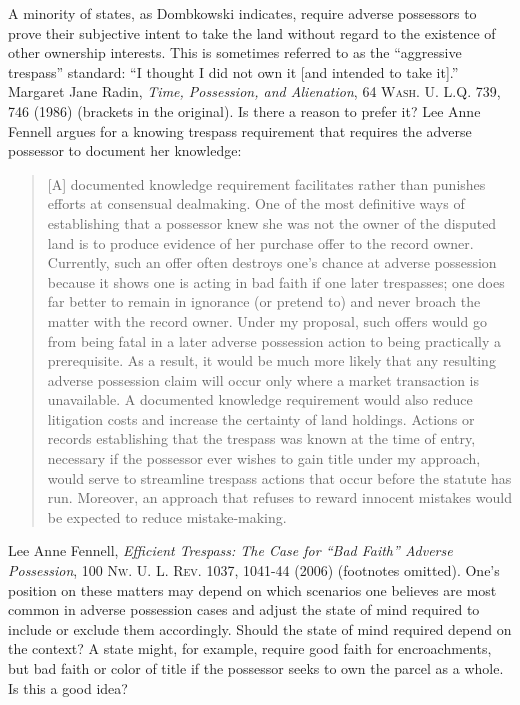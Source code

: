 
\item A minority of states, as Dombkowski indicates, require adverse possessors
to prove their subjective intent to take the land without regard to the
existence of other ownership interests. This is sometimes referred to as the
``aggressive trespass'' standard: ``I thought I did not own it [and intended to
take it].'' Margaret Jane Radin, \textit{Time, Possession, and Alienation}, 64
\textsc{Wash. U. L.Q.} 739, 746 (1986) (brackets in the original). Is there a
reason to prefer it? Lee Anne Fennell argues for a knowing trespass requirement
that requires the adverse possessor to document her knowledge:
\begin{quote}
[A] documented knowledge requirement facilitates rather than punishes efforts at
consensual dealmaking. One of the most definitive ways of establishing that a
possessor knew she was not the owner of the disputed land is to produce
evidence of her purchase offer to the record owner. Currently, such an offer
often destroys one's chance at adverse possession because it shows one is
acting in bad faith if one later trespasses; one does far better to remain in
ignorance (or pretend to) and never broach the matter with the record owner.
Under my proposal, such offers would go from being fatal in a later adverse
possession action to being practically a prerequisite. As a result, it would be
much more likely that any resulting adverse possession claim will occur only
where a market transaction is unavailable. A documented knowledge requirement
would also reduce litigation costs and increase the certainty of land holdings.
Actions or records establishing that the trespass was known at the time of
entry, necessary if the possessor ever wishes to gain title under my approach,
would serve to streamline trespass actions that occur before the statute has
run. Moreover, an approach that refuses to reward innocent mistakes would be
expected to reduce mistake-making.
\end{quote}
Lee Anne Fennell, \textit{Efficient Trespass: The Case for ``Bad Faith'' Adverse
Possession}, 100 \textsc{Nw. U. L. Rev}. 1037, 1041-44 (2006) (footnotes
omitted). One's position on these matters may depend on which scenarios one
believes are most common in adverse possession cases and adjust the state of
mind required to include or exclude them accordingly. Should the state of mind
required depend on the context? A state might, for example, require good faith
for encroachments, but bad faith or color of title if the possessor seeks to
own the parcel as a whole. Is this a good idea? 

